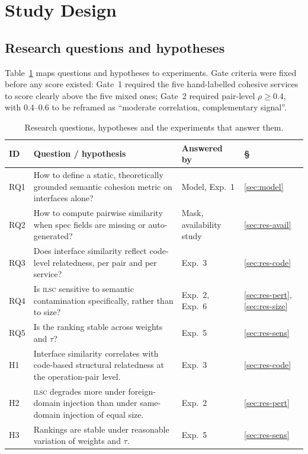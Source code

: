 \documentclass[journal]{IEEEtran}
\newcommand{\ilsc}{\textsc{ilsc}}
\begin{document}
\section{Study Design}
\label{sec:design}

\subsection{Research questions and hypotheses}
Table~\ref{tab:rqs} maps questions and hypotheses to experiments. Gate criteria
were fixed before any score existed: Gate~1 required the five hand-labelled
cohesive services to score clearly above the five mixed ones; Gate~2 required
pair-level $\rho \ge 0.4$, with $0.4$--$0.6$ to be reframed as ``moderate
correlation, complementary signal''.

\begin{table}[!t]
\caption{Research questions, hypotheses and the experiments that answer them.}
\label{tab:rqs}
\centering
\footnotesize
\begin{tabular}{@{}p{0.44cm}p{5.0cm}p{1.05cm}p{0.75cm}@{}}
\toprule
\textbf{ID} & \textbf{Question / hypothesis} & \textbf{Answered by} & \textbf{\S} \\
\midrule
RQ1 & How to define a static, theoretically grounded semantic cohesion metric on interfaces alone? & Model, Exp.~1 & \ref{sec:model} \\
RQ2 & How to compute pairwise similarity when spec fields are missing or auto-generated? & Mask, availability study & \ref{sec:res-avail} \\
RQ3 & Does interface similarity reflect code-level relatedness, per pair and per service? & Exp.~3 & \ref{sec:res-code} \\
RQ4 & Is \ilsc{} sensitive to semantic contamination specifically, rather than to size? & Exp.~2, Exp.~6 & \ref{sec:res-pert}, \ref{sec:res-size} \\
RQ5 & Is the ranking stable across weights and $\tau$? & Exp.~5 & \ref{sec:res-sens} \\
\midrule
H1 & Interface similarity correlates with code-based structural relatedness at the operation-pair level. & Exp.~3 & \ref{sec:res-code} \\
H2 & \ilsc{} degrades more under foreign-domain injection than under same-domain injection of equal size. & Exp.~2 & \ref{sec:res-pert} \\
H3 & Rankings are stable under reasonable variation of weights and $\tau$. & Exp.~5 & \ref{sec:res-sens} \\
\bottomrule
\end{tabular}
\end{table}
\end{document}
